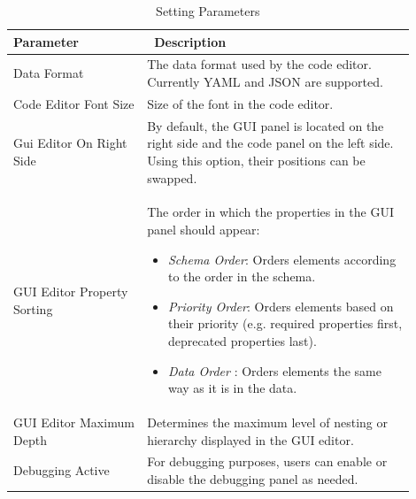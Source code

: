 \begin{table}
    \centering
    \caption{Setting Parameters\label{tab:settings}}
    \begin{tabular}{@{}p{0.3\linewidth}p{0.6\linewidth}@{}}
        \toprule
        \textbf{Parameter} & \textbf{\ Description} \\
        \midrule
        Data Format & The data format used by the code editor. Currently YAML and JSON are supported. \\
        Code Editor Font Size & Size of the font in the code editor. \\
        Gui Editor On Right Side & By default, the GUI panel is located on the right side and the code panel on the left side. Using this option, their positions can be swapped. \\
        GUI Editor Property Sorting & The order in which the properties in the GUI panel should appear:
        \begin{itemize}
            \item \textit{Schema Order}: Orders elements according to the order in the schema.
            \item \textit{Priority Order}: Orders elements based on their priority (e.g. required properties first, deprecated properties last).
            \item \textit{Data Order }: Orders elements the same way as it is in the data.
        \end{itemize} \\
        GUI Editor Maximum Depth & Determines the maximum level of nesting or hierarchy displayed in the GUI editor. \\
        Debugging Active & For debugging purposes, users can enable or disable the debugging panel as needed.  \\
        \bottomrule
    \end{tabular}
\end{table}


